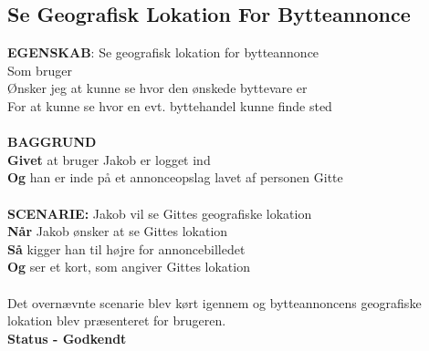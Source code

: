 \subsection{Se Geografisk Lokation For Bytteannonce}
{\color{blue}\textbf{EGENSKAB}:} Se geografisk lokation for bytteannonce \\
Som bruger \\
Ønsker jeg at kunne se hvor den ønskede byttevare er \\
For at kunne se hvor en evt. byttehandel kunne finde sted\\ \\
{\color{blue}\textbf{BAGGRUND}} \\
{\color{blue}\textbf{Givet}} at bruger Jakob er logget ind \\
{\color{blue}\textbf{Og}} han er inde på et annonceopslag lavet af personen Gitte\\\\
{\color{blue}\textbf{SCENARIE:}} Jakob vil se Gittes geografiske lokation \\
{\color{blue}\textbf{Når}} Jakob ønsker at se Gittes lokation \\
{\color{blue}\textbf{Så}} kigger han til højre for annoncebilledet \\
{\color{blue}\textbf{Og}} ser et kort, som angiver Gittes lokation
\\ \\
Det overnævnte scenarie blev kørt igennem og bytteannoncens geografiske lokation blev  præsenteret for brugeren.\\
\textbf{Status - Godkendt}

